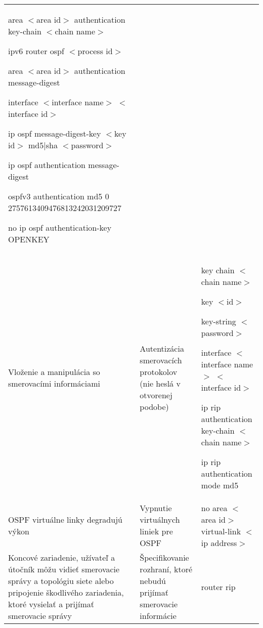 \begin{longtable}[!htbp]{|L{10em}L{10em}>{\selectfont}L{34em}|}
	\hspace{0.5em}area $<$area id$>$ authentication key-chain $<$chain name$>$
	
	ipv6 router ospf $<$process id$>$
	
	\hspace{0.5em}area $<$area id$>$ authentication message-digest
	
	interface $<$interface name$>$ $<$interface id$>$
	
	\hspace{0.5em}ip ospf message-digest-key $<$key id$>$ md5|sha $<$password$>$
	
	\hspace{0.5em}ip ospf authentication message-digest
	
	\hspace{0.5em}ospfv3 authentication md5 0 2757613409476813242031209727
	
	\hspace{0.5em}no ip ospf authentication-key OPENKEY\\
	
	
	
	
	 Vloženie a manipulácia so smerovacími informáciami	&Autentizácia smerovacích protokolov (nie heslá v otvorenej podobe)	&key chain $<$chain name$>$
	
	\hspace{0.5em}key $<$id$>$
	
	\hspace{1em}key-string $<$password$>$
	
	interface $<$interface name$>$ $<$interface id$>$
	
	\hspace{0.5em}ip rip authentication key-chain $<$chain name$>$
	
	\hspace{0.5em}ip rip authentication mode md5\\
	
	
	
	
	OSPF virtuálne linky degradujú výkon	&Vypnutie virtuálnych liniek pre OSPF	&no area $<$area id$>$ virtual-link $<$ip address$>$\\
	
	
	
	 Koncové zariadenie, užívateľ a útočník môžu vidieť smerovacie správy a topológiu siete alebo pripojenie škodlivého zariadenia, ktoré vysielať a prijímať smerovacie správy	&Špecifikovanie rozhraní, ktoré nebudú prijímať smerovacie informácie	&router rip
	

\end{longtable}
